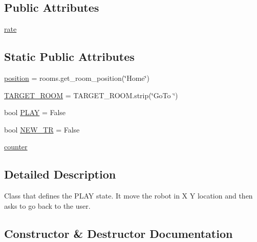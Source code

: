 \subsection*{Public Attributes}
\begin{DoxyCompactItemize}
\item 
\hyperlink{classcommandManager_1_1Play_a34aba8df5dfec3560f194934b7e377ad}{rate}
\end{DoxyCompactItemize}
\subsection*{Static Public Attributes}
\begin{DoxyCompactItemize}
\item 
\hyperlink{classcommandManager_1_1Play_a0cd6441e9cc0ec9ec7acb974b5b1354e}{position} = rooms.\+get\+\_\+room\+\_\+position(\char`\"{}Home\char`\"{})
\item 
\hyperlink{classcommandManager_1_1Play_a4279053c8c702e0fcbc425efcd2b207c}{T\+A\+R\+G\+E\+T\+\_\+\+R\+O\+OM} = T\+A\+R\+G\+E\+T\+\_\+\+R\+O\+O\+M.\+strip(\char`\"{}Go\+To \char`\"{})
\item 
bool \hyperlink{classcommandManager_1_1Play_aba155955f205f7be6642932d8de7a502}{P\+L\+AY} = False
\item 
bool \hyperlink{classcommandManager_1_1Play_ad7f22fd7336565c24c299173ddd2f7b4}{N\+E\+W\+\_\+\+TR} = False
\item 
\hyperlink{classcommandManager_1_1Play_a0999085c98a27adf5b79df2691a7e222}{counter}
\end{DoxyCompactItemize}


\subsection{Detailed Description}
\begin{DoxyVerb}Class that defines the PLAY state. 
 It move the robot in X Y location and then asks to go back to the user.\end{DoxyVerb}
 

\subsection{Constructor \& Destructor Documentation}
